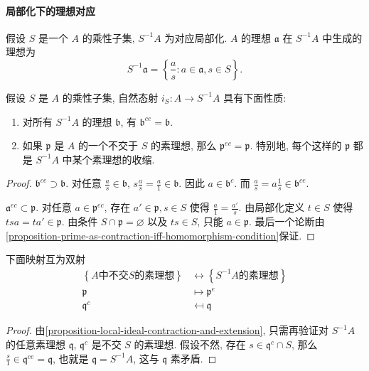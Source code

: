 \paragraph{局部化下的理想对应} 假设 \( S \) 是一个 \( A \) 的乘性子集, \( S^{-1}
A \) 为对应局部化. \( A \) 的理想 \( \mathfrak{a} \) 在 \( S^{-1}A \)
中生成的理想为
\[
  S^{-1} \mathfrak{a} = \left\lbrace \frac{a}{s}: a \in \mathfrak{a}, s \in S
  \right\rbrace.
\]
\begin{proposition}
  \label{proposition-local-ideal-contraction-and-extension}
  假设 \( S \) 是 \( A \) 的乘性子集, 自然态射 \( i_S: A \to  S^{-1} A \)
  具有下面性质:
  \begin{enumerate}
    \item 对所有 \( S^{-1} A \) 的理想 \( \mathfrak{b} \), 有 \(
      \mathfrak{b}^{ce} = \mathfrak{b} \).
    \item 如果 \( \mathfrak{p} \) 是 \( A \) 的一个不交于 \( S \) 的素理想, 那么
      \( \mathfrak{p}^{ec} = \mathfrak{p} \).
      特别地, 每个这样的 \( \mathfrak{p} \) 都是 \( S^{-1} A \)
      中某个素理想的收缩.
  \end{enumerate}
\end{proposition}
\begin{proof}
  \( \mathfrak{b}^{ce} \supset \mathfrak{b} \).
  对任意 \( \frac{a}{s} \in \mathfrak{b} \), \( s\frac{a}{s} = \frac{a}{1} \in
  \mathfrak{b} \).
  因此 \( a \in \mathfrak{b}^c \). 而 \( \frac{a}{s} = a \frac{1}{s}
  \in \mathfrak{b}^{ce} \).

  \( \mathfrak{a}^{ec} \subset \mathfrak{p} \).
  对任意 \( a \in \mathfrak{p}^{ec} \), 存在 \( a' \in \mathfrak{p}, s \in S \)
  使得 \( \frac{a}{1} = \frac{a'}{s} \).
  由局部化定义 \( t \in S \) 使得 \( tsa = ta' \in \mathfrak{p} \).
  由条件 \( S \cap \mathfrak{p} = \varnothing \) 以及 \( ts \in S \), 只能 \( a
  \in \mathfrak{p} \).
  最后一个论断由\cref{proposition-prime-as-contraction-iff-homomorphism-condition}保证.
\end{proof}

\begin{proposition}
  下面映射互为双射
  \[
    \begin{split}
      \left\lbrace A \text{中不交} S \text{的素理想} \right\rbrace
      &\leftrightarrow \left\lbrace S^{-1} A \text{的素理想} \right\rbrace\\
      \mathfrak{p} &\mapsto \mathfrak{p}^e\\
      \mathfrak{q}^c &\mapsfrom \mathfrak{q}
    \end{split}
  \]
\end{proposition}
\begin{proof}
  由\cref{proposition-local-ideal-contraction-and-extension}, 只需再验证对 \(
  S^{-1}A \) 的任意素理想 \( \mathfrak{q} \), \( \mathfrak{q}^c \) 是不交 \( S
  \) 的素理想.
  假设不然, 存在 \( s \in \mathfrak{q}^c \cap S \), 那么 \( \frac{s}{1} \in
  \mathfrak{q}^{ce} = \mathfrak{q} \), 也就是 \( \mathfrak{q} = S^{-1} A \),
  这与 \( \mathfrak{q} \) 素矛盾.
\end{proof}

